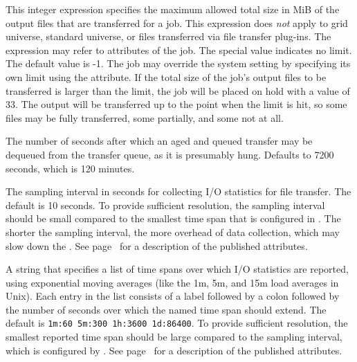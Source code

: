 \begin{description}
\label{param:MaxTransferOutputMB}
\item[\Macro{MAX\_TRANSFER\_OUTPUT\_MB}]
  This integer expression specifies the maximum allowed total size in
  MiB of the output files that are transferred for a job.  This
  expression does \emph{not} apply to grid universe, standard universe, or
  files transferred via file transfer plug-ins.  
  The expression may refer to attributes of the job.
  The special value  indicates no limit.  
  The default value is -1.
  The job may override the system setting
  by specifying its own limit using the 
  attribute.  If the total size of the job's output files to be
  transferred is larger than the limit, the job will be placed on hold
  with a  value of 33.
  The output will be transferred up to the point
  when the limit is hit, so some files may be fully transferred, some
  partially, and some not at all.

\label{param:MaxTransferQueueAge}
\item[\Macro{MAX\_TRANSFER\_QUEUE\_AGE}]
  The number of seconds after which an aged and queued transfer may be
  dequeued from the transfer queue, as it is presumably hung.
  Defaults to 7200 seconds, which is 120 minutes.

\label{param:TransferIoReportInterval}
\item[\Macro{TRANSFER\_IO\_REPORT\_INTERVAL}]
  The sampling interval in seconds for collecting I/O statistics for
  file transfer.  The default is 10 seconds.  To provide sufficient
  resolution, the sampling interval should be small compared to the
  smallest time span that is configured in
  .  The shorter the sampling
  interval, the more overhead of data collection, which may slow down
  the .  See
  page~\pageref{sec:FT-Scheduler-ClassAd-Attributes} for a description
  of the published attributes.

\label{param:TransferIoReportTimespans}
\item[\Macro{TRANSFER\_IO\_REPORT\_TIMESPANS}]
  A string that specifies a list of time spans over which I/O
  statistics are reported, using exponential moving averages (like the
  1m, 5m, and 15m load averages in Unix).  Each entry in the list
  consists of a label followed by a colon followed by the number of
  seconds over which the named time span should extend.  The default is
  \verb|1m:60 5m:300 1h:3600 1d:86400|.  To provide sufficient
  resolution, the smallest reported time span should be large compared
  to the sampling interval, which is configured by
  .  See
  page~\pageref{sec:FT-Scheduler-ClassAd-Attributes} for a description
  of the published attributes.


\end{description}
